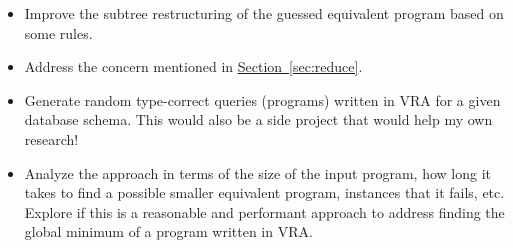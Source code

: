 \documentclass[12pt]{article}
\newcommand{\secref}[1]{\hyperref[sec:#1]{Section~\ref*{sec:#1}}}
\begin{document}
\begin{itemize}
\item Improve the subtree restructuring of the guessed equivalent program 
based on some rules.
\item Address the concern mentioned in \secref{reduce}.
\item Generate random type-correct queries (programs) written in VRA for a given database 
schema. This would also be a side project that would help my own research!
\item Analyze the approach in terms of the size of the input program, how long
it takes to find a possible smaller equivalent program, instances that it fails, etc.
Explore if this is a reasonable and performant 
approach to address finding the global minimum of a program
written in VRA.
\end{itemize}

\begin{comment}
Made the mistake of reading the news and lost track of time! However, the following contains 
my initial thoughts on the project. I will provide a comprehensive discussion for the final report. 

After thinking about this reduction for a week, I do not think that, generally speaking, an AST 
can be linearized to the extent that it is converted to a single propositional formula to determine
variation minimization or even worse structural or semantical equivalence. 
Thus, after narrowing down the problem definition, I began thinking about different types of minimizations
such as redundant branches and dead branches. I also believe I was able to do so because of the
nature of choice calculus and that it uses propositional formulas within itself. At the same time, I 
am skeptical that the reductions I have provided cover all the cases and I am interested to 
know if there is a way to prove or deny that this reduction can certainly determine if
a variational query can be minimized or not.
I did not simplified the query language that much and I believe adding operations such as 
union and intersection would not break down the reduction. However, an important difference
of the language that I provided here with the original VRA is that variation appears in the language
used in this project in only one manner as opposed to original VRA that provides tagging elements
with feature expression for a better usability. Such simplification does not reduce the expressiveness of the
language, however, it made it syntactically more consistent which helped with the reduction. Purposeful language design does wonders!

ADD FOR FINAL SUBMISSION:
-renaming in lang design!! this would have made abt in stead of ast and we would have to keep track of the bindings.
\end{comment}



\end{document}
